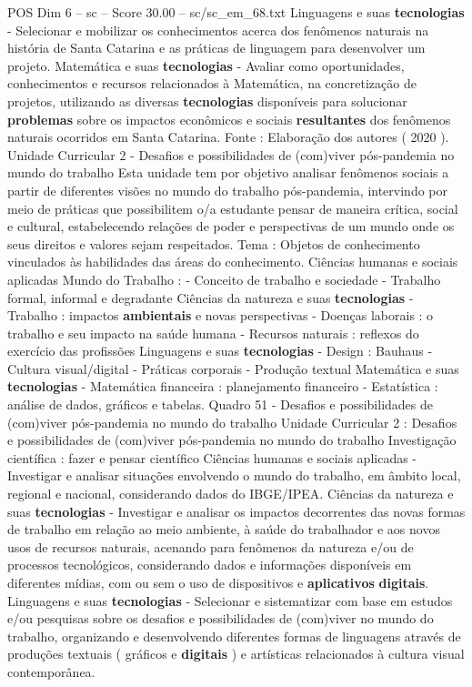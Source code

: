\begin{textsample}{POS Dim 6 – sc – Score 30.00 – sc/sc\_em\_68.txt}
Linguagens e suas \textbf{tecnologias} - Selecionar e mobilizar os conhecimentos acerca dos fenômenos naturais na história de Santa Catarina e as práticas de linguagem para desenvolver um projeto.
Matemática e suas \textbf{tecnologias} - Avaliar como oportunidades, conhecimentos e recursos relacionados à Matemática, na concretização de projetos, utilizando as diversas \textbf{tecnologias} disponíveis para solucionar \textbf{problemas} sobre os impactos econômicos e sociais \textbf{resultantes} dos fenômenos naturais ocorridos em Santa Catarina.
Fonte : Elaboração dos autores ( 2020 ).
Unidade Curricular 2 - Desafios e possibilidades de (com)viver pós-pandemia no mundo do trabalho Esta unidade tem por objetivo analisar fenômenos sociais a partir de diferentes visões no mundo do trabalho pós-pandemia, intervindo por meio de práticas que possibilitem o/a estudante pensar de maneira crítica, social e cultural, estabelecendo relações de poder e perspectivas de um mundo onde os seus direitos e valores sejam respeitados.
Tema : Objetos de conhecimento vinculados às habilidades das áreas do conhecimento.
Ciências humanas e sociais aplicadas Mundo do Trabalho : - Conceito de trabalho e sociedade - Trabalho formal, informal e degradante Ciências da natureza e suas \textbf{tecnologias} - Trabalho : impactos \textbf{ambientais} e novas perspectivas - Doenças laborais : o trabalho e seu impacto na saúde humana - Recursos naturais : reflexos do exercício das profissões Linguagens e suas \textbf{tecnologias} - Design : Bauhaus - Cultura visual/digital - Práticas corporais - Produção textual Matemática e suas \textbf{tecnologias} - Matemática financeira : planejamento financeiro - Estatística : análise de dados, gráficos e tabelas.
Quadro 51 - Desafios e possibilidades de (com)viver pós-pandemia no mundo do trabalho Unidade Curricular 2 : Desafios e possibilidades de (com)viver pós-pandemia no mundo do trabalho Investigação científica : fazer e pensar científico Ciências humanas e sociais aplicadas - Investigar e analisar situações envolvendo o mundo do trabalho, em âmbito local, regional e nacional, considerando dados do IBGE/IPEA.
Ciências da natureza e suas \textbf{tecnologias} - Investigar e analisar os impactos decorrentes das novas formas de trabalho em relação ao meio ambiente, à saúde do trabalhador e aos novos usos de recursos naturais, acenando para fenômenos da natureza e/ou de processos tecnológicos, considerando dados e informações disponíveis em diferentes mídias, com ou sem o uso de dispositivos e \textbf{aplicativos} \textbf{digitais}.
Linguagens e suas \textbf{tecnologias} - Selecionar e sistematizar com base em estudos e/ou pesquisas sobre os desafios e possibilidades de (com)viver no mundo do trabalho, organizando e desenvolvendo diferentes formas de linguagens através de produções textuais ( gráficos e \textbf{digitais} ) e artísticas relacionados à cultura visual contemporânea.

\end{textsample}

